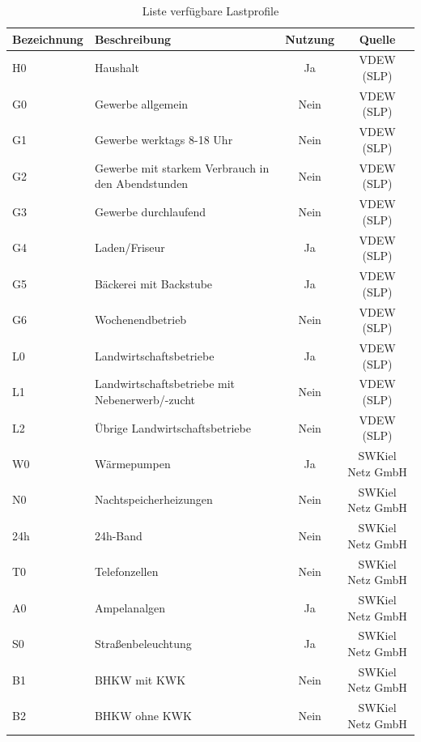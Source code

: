 \begin{table}[htbp]
    \centering
    \caption{Liste verfügbare Lastprofile}
    \label{tab:lastprofile}
    \begin{tabular}{llcc}
        \toprule
        \textbf{Bezeichnung} & \textbf{Beschreibung} & \textbf{Nutzung} & \textbf{Quelle} \\
        \midrule
        H0 & Haushalt & Ja & VDEW (SLP) \\
        G0 & Gewerbe allgemein & Nein & VDEW (SLP) \\
        G1 & Gewerbe werktags 8-18 Uhr & Nein & VDEW (SLP) \\
        G2 & Gewerbe mit starkem Verbrauch in den Abendstunden & Nein & VDEW (SLP) \\
        G3 & Gewerbe durchlaufend & Nein & VDEW (SLP) \\
        G4 & Laden/Friseur & Ja & VDEW (SLP) \\
        G5 & Bäckerei mit Backstube & Ja & VDEW (SLP) \\
        G6 & Wochenendbetrieb & Nein & VDEW (SLP) \\
        L0 & Landwirtschaftsbetriebe & Ja & VDEW (SLP) \\
        L1 & Landwirtschaftsbetriebe mit Nebenerwerb/-zucht & Nein & VDEW (SLP) \\
        L2 & Übrige Landwirtschaftsbetriebe & Nein & VDEW (SLP) \\
        W0 & Wärmepumpen & Ja & SWKiel Netz GmbH \\
        N0 & Nachtspeicherheizungen & Nein & SWKiel Netz GmbH \\
        24h & 24h-Band & Nein & SWKiel Netz GmbH \\
        T0 & Telefonzellen & Nein & SWKiel Netz GmbH \\
        A0 & Ampelanalgen & Ja & SWKiel Netz GmbH \\
        S0 & Straßenbeleuchtung & Ja & SWKiel Netz GmbH \\
        B1 & BHKW mit KWK & Nein & SWKiel Netz GmbH \\
        B2 & BHKW ohne KWK & Nein & SWKiel Netz GmbH \\
        \bottomrule
    \end{tabular}
\end{table}

